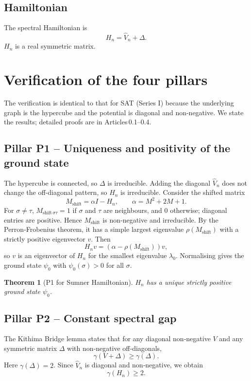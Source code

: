 \documentclass[11pt,a4paper]{article}
\newtheorem{theorem}{Theorem}[section]
\begin{document}
\subsection{Hamiltonian}
The spectral Hamiltonian is
\[
H_n = \hat{V}_n + \Delta.
\]
$H_n$ is a real symmetric matrix.

\section{Verification of the four pillars}
The verification is identical to that for SAT (Series I) because the underlying graph is the hypercube and the potential is diagonal and non‑negative. We state the results; detailed proofs are in Articles 0.1–0.4.

\subsection{Pillar P1 – Uniqueness and positivity of the ground state}
The hypercube is connected, so $\Delta$ is irreducible. Adding the diagonal $\hat{V}_n$ does not change the off‑diagonal pattern, so $H_n$ is irreducible. Consider the shifted matrix
\[
M_{\text{shift}} = \alpha I - H_n,\qquad \alpha = M^2 + 2M + 1.
\]
For $\sigma\neq\tau$, $M_{\text{shift}\,\sigma\tau} = 1$ if $\sigma$ and $\tau$ are neighbours, and $0$ otherwise; diagonal entries are positive. Hence $M_{\text{shift}}$ is non‑negative and irreducible. By the Perron‑Frobenius theorem, it has a simple largest eigenvalue $\rho(M_{\text{shift}})$ with a strictly positive eigenvector $v$. Then
\[
H_n v = (\alpha - \rho(M_{\text{shift}})) v,
\]
so $v$ is an eigenvector of $H_n$ for the smallest eigenvalue $\lambda_0$. Normalising gives the ground state $\psi_0$ with $\psi_0(\sigma) > 0$ for all $\sigma$.

\begin{theorem}[P1 for Sumner Hamiltonian]
$H_n$ has a unique strictly positive ground state $\psi_0$.
\end{theorem}

\subsection{Pillar P2 – Constant spectral gap}
The Kithima Bridge lemma states that for any diagonal non‑negative $V$ and any symmetric matrix $\Delta$ with non‑negative off‑diagonals,
\[
\gamma(V + \Delta) \ge \gamma(\Delta).
\]
Here $\gamma(\Delta) = 2$. Since $\hat{V}_n$ is diagonal and non‑negative, we obtain
\[
\gamma(H_n) \ge 2.
\]
\end{document}
